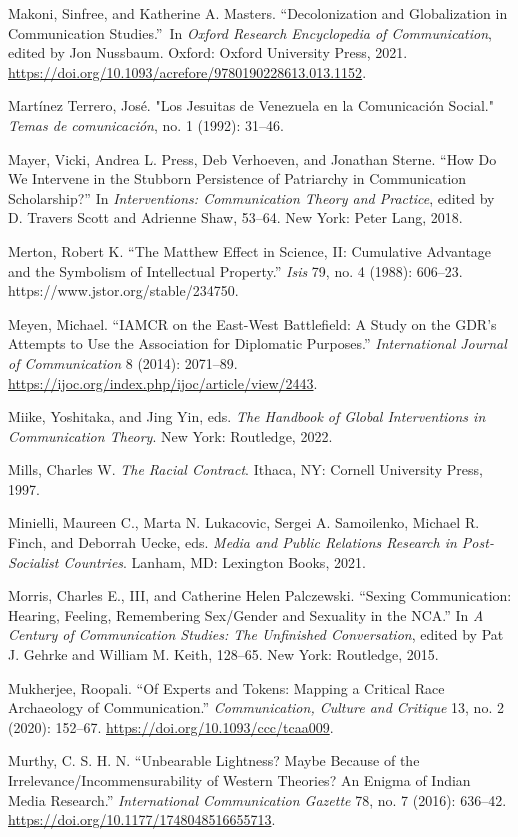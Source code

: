 \documentclass{tufte-handout}
\begin{document}
\begin{hangparas}{.25in}{1}
Makoni, Sinfree, and Katherine A. Masters. ``Decolonization and
Globalization in Communication Studies.''~In \emph{Oxford Research
Encyclopedia of Communication}, edited by Jon Nussbaum. Oxford: Oxford
University Press, 2021.
\url{https://doi.org/10.1093/acrefore/9780190228613.013.1152}.

Martínez Terrero, José. "Los Jesuitas de Venezuela en la Comunicación
Social." \emph{Temas de comunicación}, no. 1 (1992): 31--46.

Mayer, Vicki, Andrea L. Press, Deb Verhoeven, and Jonathan Sterne. ``How
Do We Intervene in the Stubborn Persistence of Patriarchy in
Communication Scholarship?'' In \emph{Interventions: Communication
Theory and Practice}, edited by D. Travers Scott and Adrienne Shaw,
53--64. New York: Peter Lang, 2018.

Merton, Robert K. ``The Matthew Effect in Science, II: Cumulative
Advantage and the Symbolism of Intellectual Property.'' \emph{Isis} 79,
no. 4 (1988): 606--23. https://www.jstor.org/stable/234750.

Meyen, Michael. ``IAMCR on the East-West Battlefield: A Study on the
GDR's Attempts to Use the Association for Diplomatic Purposes.''
\emph{International Journal of Communication} 8 (2014): 2071--89.
\url{https://ijoc.org/index.php/ijoc/article/view/2443}.

Miike, Yoshitaka, and Jing Yin, eds. \emph{The Handbook of Global
Interventions in Communication Theory}. New York: Routledge, 2022.

Mills, Charles W. \emph{The Racial Contract}. Ithaca, NY: Cornell
University Press, 1997.

Minielli, Maureen C., Marta N. Lukacovic, Sergei A. Samoilenko, Michael
R. Finch, and Deborrah Uecke, eds. \emph{Media and Public Relations
Research in Post-Socialist Countries}. Lanham, MD: Lexington Books,
2021.

Morris, Charles E., III, and Catherine Helen Palczewski. ``Sexing
Communication: Hearing, Feeling, Remembering Sex/Gender and Sexuality in
the NCA.'' In \emph{A Century of Communication Studies: The Unfinished
Conversation}, edited by Pat J. Gehrke and William M. Keith, 128--65.
New York: Routledge, 2015.

Mukherjee, Roopali. ``Of Experts and Tokens: Mapping a Critical Race
Archaeology of Communication.'' \emph{Communication, Culture and
Critique} 13, no. 2 (2020): 152--67.
\url{https://doi.org/10.1093/ccc/tcaa009}.

Murthy, C. S. H. N. ``Unbearable Lightness? Maybe Because of the
Irrelevance/Incommensurability of Western Theories? An Enigma of Indian
Media Research.'' \emph{International Communication Gazette} 78, no. 7
(2016): 636--42. \url{https://doi.org/10.1177/1748048516655713}.


\end{hangparas}
\end{document}
